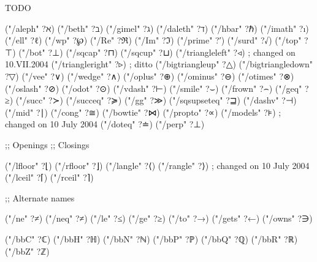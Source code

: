 TODO

 ("/aleph" ?ℵ) ("/beth" ?ℶ) ("/gimel" ?ℷ) ("/daleth" ?ℸ)
 ("/hbar" ?ℏ)
 ("/imath" ?ı)
 ("/ell" ?ℓ)
 ("/wp" ?℘)
 ("/Re" ?ℜ) ("/Im" ?ℑ)
 ("/prime" ?′)
 ("/surd" ?√)
 ("/top" ?⊤)
 ("/bot" ?⊥)
 ("/sqcap" ?⊓) ("/sqcup" ?⊔)
 ("/triangleleft" ?◃) ; changed on 10.VII.2004
 ("/triangleright" ?▹) ; ditto
 ("/bigtriangleup" ?△) ("/bigtriangledown" ?▽)
 ("/vee" ?∨) ("/wedge" ?∧)
 ("/oplus" ?⊕) ("/ominus" ?⊖)
 ("/otimes" ?⊗) ("/oslash" ?⊘)
 ("/odot" ?⊙)
 ("/vdash" ?⊢)
 ("/smile" ?⌣)
 ("/frown" ?⌢)
 ("/geq" ?≥)
 ("/succ" ?≻) ("/succeq" ?≽)
 ("/gg" ?≫)
 ("/sqsupseteq" ?⊒)
 ("/dashv" ?⊣)
 ("/mid" ?∣)
 ("/cong" ?≅)
 ("/bowtie" ?⋈)
 ("/propto" ?∝)
 ("/models" ?⊧) ; changed on 10 July 2004
 ("/doteq" ?≐)
 ("/perp" ?⊥)

 ;; Openings       ;; Closings    
                                  
 ("/lfloor" ?⌊)   ("/rfloor" ?⌋)
 ("/langle" ?⟨)   ("/rangle" ?⟩) ; changed on 10 July 2004
 ("/lceil"  ?⌈)   ("/rceil"  ?⌉) 

 ;; Alternate names

 ("/ne" ?≠) ("/neq" ?≠)
 ("/le" ?≤) ("/ge" ?≥)
 ("/to" ?→)
 ("/gets" ?←)
 ("/owns" ?∋)

 ("/bbC" ?ℂ) ("/bbH" ?ℍ) ("/bbN" ?ℕ) ("/bbP" ?ℙ)
 ("/bbQ" ?ℚ) ("/bbR" ?ℝ) ("/bbZ" ?ℤ)
